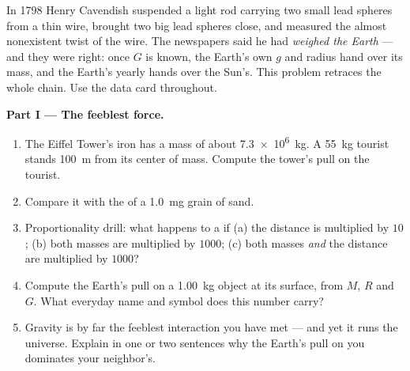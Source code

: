 \begin{problem}
\label{pb:g10:universal-gravitation:1}
In 1798 Henry Cavendish suspended a light rod carrying two small lead
spheres from a thin wire, brought two big lead spheres close, and
measured the almost nonexistent twist of the wire. The newspapers said
he had \emph{weighed the Earth} --- and they were right: once $G$ is
known, the Earth's own $g$ and radius hand over its mass, and the
Earth's yearly  hands over the Sun's. This problem retraces the
whole chain. Use the data card throughout.

\medskip
\noindent\textbf{Part I --- The feeblest force.}
\begin{enumerate}
  \item The Eiffel Tower's iron has a mass of about \qty{7.3e6}{kg}. A
        \qty{55}{kg} tourist stands \qty{100}{m} from its center of
        mass. Compute the tower's pull on the tourist.
  \item Compare it with the  of a \qty{1.0}{mg} grain of sand.
  \item Proportionality drill: what happens to a 
        if (a) the distance is multiplied by $10$; (b) both masses are
        multiplied by $1000$; (c) both masses \emph{and} the distance
        are multiplied by $1000$?
  \item Compute the Earth's pull on a \qty{1.00}{kg} object at its
        surface, from $M$, $R$ and $G$. What everyday name and symbol
        does this number carry?
  \item Gravity is by far the feeblest interaction you have met ---
        and yet it runs the universe. Explain in one or two sentences
        why the Earth's pull on you dominates your neighbor's.
\end{enumerate}


\end{problem}
